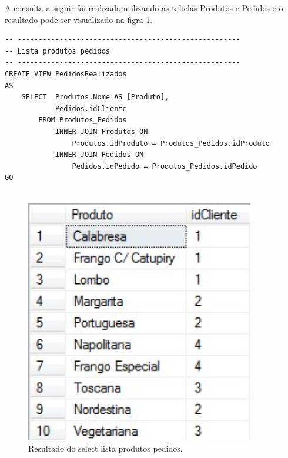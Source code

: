 \documentclass[
	12pt,				%
	openright,			%
	oneside,			%
	a4paper,			%
	chapter=TITLE,		%
	section=TITLE,		%
	english,			%
	brazil				%
	]{abntex2}
\begin{document}
    A consulta a seguir foi realizada utilizando as tabelas Produtos e Pedidos 
    e o resultado pode ser visualizado na figra \ref{select04}.
    \begin{lstlisting}
-- -----------------------------------------------------
-- Lista produtos pedidos
-- -----------------------------------------------------
CREATE VIEW PedidosRealizados
AS 
	SELECT  Produtos.Nome AS [Produto], 
	        Pedidos.idCliente 
        FROM Produtos_Pedidos
		    INNER JOIN Produtos ON 
		        Produtos.idProduto = Produtos_Pedidos.idProduto 
		    INNER JOIN Pedidos ON 
		        Pedidos.idPedido = Produtos_Pedidos.idPedido 
GO    
    
    \end{lstlisting}
    \begin{figure}[h]
         \centering
         \includegraphics[width=10cm,keepaspectratio]{Imgs/Select_004}
         \caption{Resultado do select lista produtos pedidos.}
         \label{select04}
    \end{figure}

    \newpage
\end{document}
